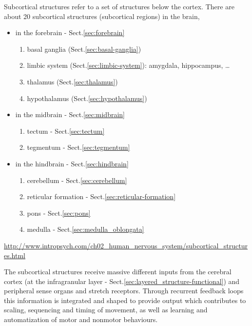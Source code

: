 Subcortical structures refer to a set of structures below the cortex.
There are about 20 subcortical structures (subcortical regions) in the brain,
\begin{itemize}
  \item in the forebrain - Sect.\ref{sec:forebrain}

\begin{enumerate}
  \item basal ganglia (Sect.\ref{sec:basal-ganglia})
  \item limbic system (Sect.\ref{sec:limbic-system}): amygdala, hippocampus, \ldots
  
  \item thalamus (Sect.\ref{sec:thalamus})
  \item hypothalamus (Sect.\ref{sec:hypothalamus})
\end{enumerate}

  \item in the midbrain - Sect.\ref{sec:midbrain}
  
\begin{enumerate}
  \item tectum - Sect.\ref{sec:tectum}
  
  \item tegmentum - Sect.\ref{sec:tegmentum}
\end{enumerate}

  
  \item in the hindbrain - Sect.\ref{sec:hindbrain}

\begin{enumerate}
  \item cerebellum - Sect.\ref{sec:cerebellum}
  \item reticular formation - Sect.\ref{sec:reticular-formation}
  
  \item pons - Sect.\ref{sec:pons}
  \item medulla - Sect.\ref{sec:medulla_oblongata}
\end{enumerate}  
\end{itemize}
\url{http://www.intropsych.com/ch02_human_nervous_system/subcortical_structures.html}

The subcortical structures receive massive different inputs from the cerebral
cortex (at the infragranular layer -
Sect.\ref{sec:layered_structure-functional}) and peripheral sense organs and
stretch receptors.
Through recurrent feedback loops this information is integrated and shaped to provide output which
contributes to scaling, sequencing and timing of movement, as well as learning
and automatization of motor and nonmotor behaviours.

